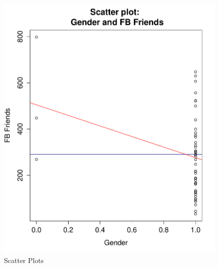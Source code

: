 
\begin{figure}[H]
\caption{Scatter Plots}
\centering
\includegraphics[scale=0.44]{./img/scatplot_fbfriends.pdf}

\end{figure}
